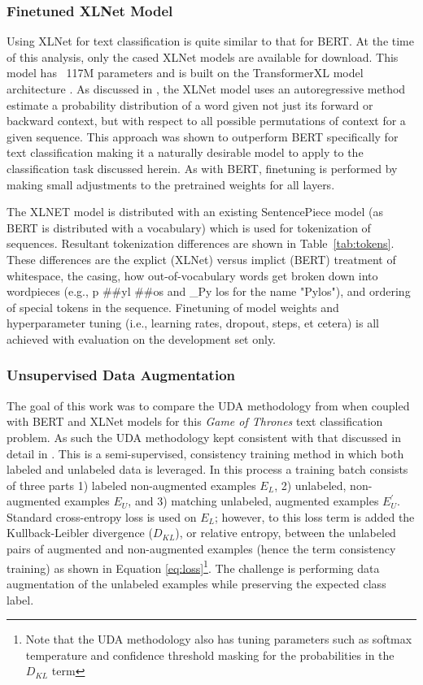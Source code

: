 \documentclass[twoside,twocolumn,10pt]{article}
\begin{document}
\subsubsection{Finetuned XLNet Model}
Using XLNet for text classification is quite similar to that for BERT. At the time of this analysis, only the cased XLNet models are available for download. This model has ~117M parameters and is built on the TransformerXL model architecture \cite{Dai:2019}. As discussed in \cite{Yang:2019}, the XLNet model uses an autoregressive method estimate a probability distribution of a word given not just its forward or backward context, but with respect to all possible permutations of context for a given sequence. This approach was shown to outperform BERT specifically for text classification making it a naturally desirable model to apply to the classification task discussed herein. As with BERT, finetuning is performed by making small adjustments to the pretrained weights for all layers.

 The XLNET model is distributed with an existing SentencePiece model (as BERT is distributed with a vocabulary) which is used for tokenization of sequences. Resultant tokenization differences are shown in Table~\ref{tab:tokens}. These differences are the explict (XLNet) versus implict (BERT) treatment of whitespace, the casing, how out-of-vocabulary words get broken down into wordpieces (e.g., p \#\#yl \#\#os and \_Py los for the name "Pylos"), and ordering of special tokens in the sequence. Finetuning of model weights and hyperparameter tuning (i.e., learning rates, dropout, steps, et cetera) is all achieved with evaluation on the development set only. 
 
\subsubsection{Unsupervised Data Augmentation}
The goal of this work was to compare the UDA methodology from \cite{Xie:2019} when coupled with BERT and XLNet models for this {\it Game of Thrones} text classification problem. As such the UDA methodology kept consistent with that discussed in detail in \cite{Xie:2019}. This is a semi-supervised, consistency training method in which both labeled and unlabeled data is leveraged. In this process a training batch consists of three parts 1) labeled non-augmented examples $E_{L}$, 2) unlabeled, non-augmented examples $E_{U}$, and 3) matching unlabeled, augmented examples $E^{\prime}_{U}$. Standard cross-entropy loss is used on $E_{L}$; however, to this loss term is added the Kullback-Leibler divergence ($D_{KL}$), or relative entropy, between the unlabeled pairs of augmented and non-augmented examples (hence the term consistency training) as shown in Equation \ref{eq:loss}\footnote{Note that the UDA methodology also has tuning parameters such as softmax temperature and confidence threshold masking for the probabilities in the $D_{KL}$ term}. The challenge is performing data augmentation of the unlabeled examples while preserving the expected class label.
\end{document}
